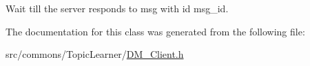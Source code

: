 Wait till the server responds to msg with id msg\_\-id. 



The documentation for this class was generated from the following file:\begin{DoxyCompactItemize}
\item 
src/commons/TopicLearner/\hyperlink{_d_m___client_8h}{DM\_\-Client.h}\end{DoxyCompactItemize}
